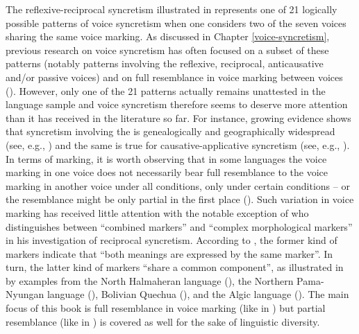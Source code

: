 The reflexive-reciprocal syncretism illustrated in  represents one of 21 logically possible patterns of voice syncretism when one considers two of the seven voices sharing the same voice marking. As discussed in Chapter \ref{voice-syncretism}, previous research on voice syncretism has often focused on a subset of these patterns (notably patterns involving the reflexive, reciprocal, anticausative and/or passive voices) and on full resemblance in voice marking between voices (). However, only one of the 21 patterns actually remains unattested in the language sample and voice syncretism therefore seems to deserve more attention than it has received in the literature so far. For instance, growing evidence shows that syncretism involving the  is genealogically and geographically widespread (see, e.g., \citealt{janic:2010}) and the same is true for causative-applicative syncretism (see, e.g., \citealt{malchukov:2017}). In terms of marking, it is worth observing that in some languages the voice marking in one voice does not necessarily bear full resemblance to the voice marking in another voice under all conditions, only under certain conditions -- or the resemblance might be only partial in the first place (). Such variation in voice marking has received little attention with the notable exception of \cite[243f.]{nedjalkov:2007d} who distinguishes between “combined markers” and “complex morphological markers” in his investigation of reciprocal syncretism. According to \citeauthor{nedjalkov:2007d}, the former kind of markers indicate that “both meanings are expressed by the same marker”. In turn, the latter kind of markers “share a common component”, as illustrated in  by examples from the North Halmaheran language  (), the Northern Pama-Nyungan language  (), Bolivian Quechua (), and the Algic language  (). The main focus of this book is full resemblance in voice marking (like in ) but partial resemblance (like in ) is covered as well for the sake of linguistic diversity.

